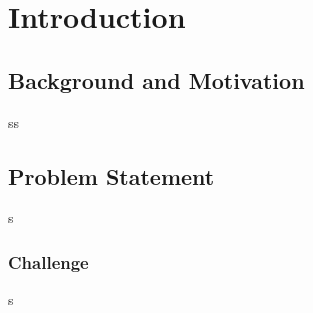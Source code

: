 \chapter{Introduction}

\section{Background and Motivation}

ss

\section{Problem Statement}

s

\subsection{Challenge}
s
